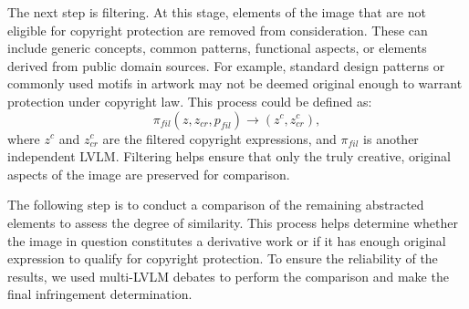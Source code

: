 The next step is filtering. At this stage, elements of the image that are not eligible for copyright protection are removed from consideration. These can include generic concepts, common patterns, functional aspects, or elements derived from public domain sources.
For example, standard design patterns or commonly used motifs in artwork may not be deemed original enough to warrant protection under copyright law. This process could be defined as:
\begin{equation}
\pi_{fil}(z, z_{{cr}}, p_{fil}) \to (z^c, z^c_{cr}),
\end{equation}
where $z^c$ and $z^c_{cr}$ are the filtered copyright expressions, and $\pi_{fil}$ is another independent LVLM. Filtering helps ensure that only the truly creative, original aspects of the image are preserved for comparison.

The following step is to conduct a comparison of the remaining abstracted elements to assess the degree of similarity. This process helps determine whether the image in question constitutes a derivative work or if it has enough original expression to qualify for copyright protection. To ensure the reliability of the results, we used multi-LVLM debates to perform the comparison and make the final infringement determination.

